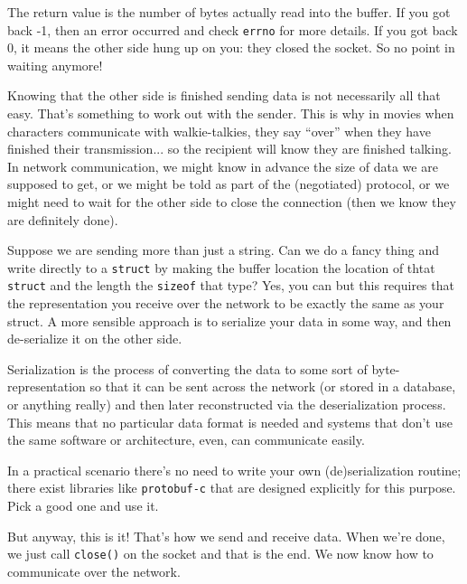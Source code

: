 The return value is the number of bytes actually read into the buffer. If you got back -1, then an error occurred and check \texttt{errno} for more details. If you got back 0, it means the other side hung up on you: they closed the socket. So no point in waiting anymore!

Knowing that the other side is finished sending data is not necessarily all that easy. That's something to work out with the sender. This is why in movies when characters communicate with walkie-talkies, they say ``over'' when they have finished their transmission... so the recipient will know they are finished talking. In network communication, we might know in advance the size of data we are supposed to get, or we might be told as part of the (negotiated) protocol, or we might need to wait for the other side to close the connection (then we know they are definitely done).

Suppose we are sending more than just a string. Can we do a fancy thing and write directly to a \texttt{struct} by making the buffer location the location of thtat \texttt{struct} and the length the \texttt{sizeof} that type? Yes, you can but this requires that the representation you receive over the network to be exactly the same as your struct. A more sensible approach is to serialize your data in some way, and then de-serialize it on the other side. 

Serialization is the process of converting the data to some sort of byte-representation so that it can be sent across the network (or stored in a database, or anything really) and then later reconstructed via the deserialization process. This means that no particular data format is needed and systems that don't use the same software or architecture, even, can communicate easily.

In a practical scenario there's no need to write your own (de)serialization routine; there exist libraries like \texttt{protobuf-c} that are designed explicitly for this purpose. Pick a good one and use it.

But anyway, this is it! That's how we send and receive data. When we're done, we just call \texttt{close()} on the socket and that is the end. We now know how to communicate over the network.


